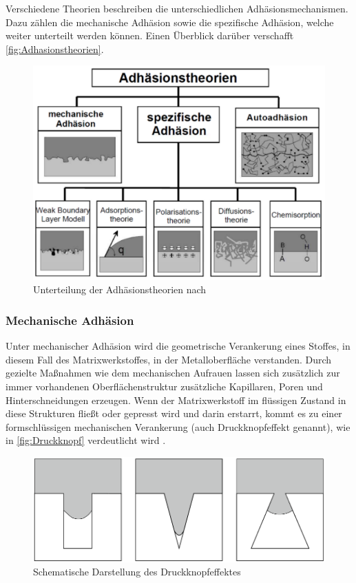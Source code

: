 Verschiedene Theorien beschreiben die unterschiedlichen Adhäsionsmechanismen.
Dazu zählen die mechanische Adhäsion sowie die spezifische Adhäsion, welche weiter unterteilt werden können.
Einen Überblick darüber verschafft \autoref{fig:Adhasionstheorien}.

\begin{figure}[H]%
    \centering
    \includegraphics[width=0.6\linewidth]{Bilder/SdT/Adhasionstheorien}
    \caption[Unterteilung der Adhäsionstheorien]{Unterteilung der Adhäsionstheorien nach~\cite{Garbassi.1998}}
    \label{fig:Adhasionstheorien}
\end{figure}

\subsubsection{Mechanische Adhäsion}

Unter mechanischer Adhäsion wird die geometrische Verankerung eines Stoffes, in diesem Fall des Matrixwerkstoffes, in der Metalloberfläche verstanden.
Durch gezielte Maßnahmen wie dem mechanischen Aufrauen lassen sich zusätzlich zur immer vorhandenen Oberflächenstruktur zusätzliche Kapillaren, Poren und Hinterschneidungen erzeugen.
Wenn der Matrixwerkstoff im flüssigen Zustand in diese Strukturen fließt oder gepresst wird und darin erstarrt, kommt es zu einer formschlüssigen mechanischen Verankerung (auch Druckknopfeffekt genannt), wie in \autoref{fig:Druckknopf} verdeutlicht wird \cite{Habenicht.2009,Mittal.1999}.


\begin{figure}[H]%
    \centering
    \includegraphics[width=0.6\linewidth]{Bilder/SdT/Druckknopfeffekt}
    \caption[Druckknopfeffekt]{Schematische Darstellung des Druckknopfeffektes~\cite{Mittal.1999}}
    \label{fig:Druckknopf}
\end{figure}

